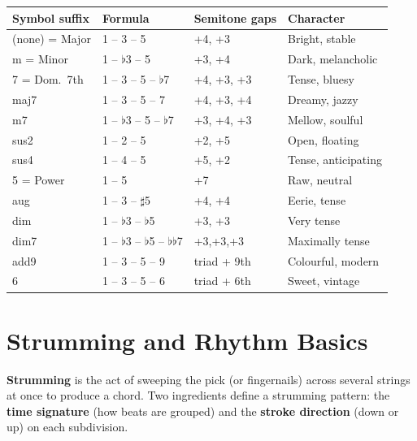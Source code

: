 \documentclass[a4paper,10pt]{article}
\begin{document}
\begin{center}\small\setlength{\tabcolsep}{0.7em}
\renewcommand{\arraystretch}{1.35}
\begin{tabular}{llll}
\toprule
\textbf{Symbol suffix} & \textbf{Formula} &
\textbf{Semitone gaps} & \textbf{Character}\\
\midrule
(none) = Major      & 1 -- 3 -- 5              & +4, +3          & Bright, stable\\
m = Minor           & 1 -- $\flat$3 -- 5        & +3, +4          & Dark, melancholic\\
7 = Dom.\ 7th       & 1 -- 3 -- 5 -- $\flat$7   & +4, +3, +3      & Tense, bluesy\\
maj7                & 1 -- 3 -- 5 -- 7          & +4, +3, +4      & Dreamy, jazzy\\
m7                  & 1 -- $\flat$3 -- 5 -- $\flat$7 & +3, +4, +3 & Mellow, soulful\\
sus2                & 1 -- 2 -- 5              & +2, +5          & Open, floating\\
sus4                & 1 -- 4 -- 5              & +5, +2          & Tense, anticipating\\
5 = Power           & 1 -- 5                   & +7              & Raw, neutral\\
aug                 & 1 -- 3 -- $\sharp$5       & +4, +4          & Eerie, tense\\
dim                 & 1 -- $\flat$3 -- $\flat$5 & +3, +3          & Very tense\\
dim7                & 1 -- $\flat$3 -- $\flat$5 -- $\flat\flat$7 & +3,+3,+3 & Maximally tense\\
add9                & 1 -- 3 -- 5 -- 9         & triad + 9th     & Colourful, modern\\
6                   & 1 -- 3 -- 5 -- 6         & triad + 6th     & Sweet, vintage\\
\bottomrule
\end{tabular}
\end{center}

\label{fin-diagrammes}
\section{Strumming and Rhythm Basics}
\label{deb-pratique}

\noindent
\textbf{Strumming} is the act of sweeping the pick (or fingernails)
across several strings at once to produce a chord.
Two ingredients define a strumming pattern: the \textbf{time signature}
(how beats are grouped) and the \textbf{stroke direction}
(down or up) on each subdivision.
\end{document}
